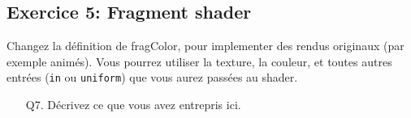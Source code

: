 \documentclass{article}
\begin{document}
\subsection{Exercice 5: Fragment shader}%

Changez la définition de fragColor, pour implementer des rendus originaux
(par exemple animés).
Vous pourrez utiliser la texture, la couleur, et toutes autres entrées (\verb|in| ou
\verb|uniform|) que vous aurez passées au shader.


\begin{itemize}
  \item[Q7.] Décrivez ce que vous avez entrepris ici.
\end{itemize}
\end{document}
